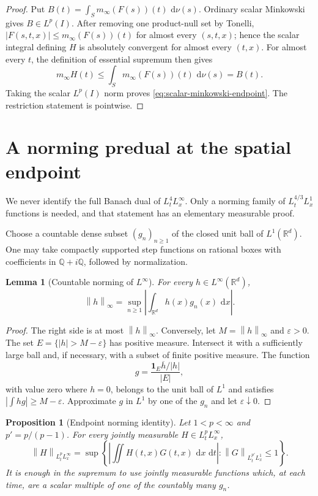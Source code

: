 \documentclass[11pt,oneside]{book}
\newtheorem{proposition}[theorem]{Proposition}
\newtheorem{lemma}[theorem]{Lemma}
\theoremstyle{definition}
\theoremstyle{remark}
\newcommand{\R}{\mathbb R}
\newcommand{\Q}{\mathbb Q}
\newcommand{\1}{\mathbf 1}
\newcommand{\dd}{\,\mathrm d}
\newcommand{\norm}[1]{\left\lVert #1\right\rVert}
\newcommand{\eps}{\varepsilon}
\begin{document}
\begin{proof}
Put $B(t)=\int_Sm_\infty(F(s))(t)\,\dd\nu(s)$.  Ordinary scalar
Minkowski gives $B\in L^p(I)$.  After removing one product-null set by
Tonelli, $|F(s,t,x)|\le m_\infty(F(s))(t)$ for almost every
$(s,t,x)$; hence the scalar integral defining $H$ is absolutely convergent
for almost every $(t,x)$.  For almost every $t$, the definition of essential
supremum then gives
\[
 m_\infty H(t)
 \le\int_Sm_\infty(F(s))(t)\,\dd\nu(s)=B(t).
\]
Taking the scalar $L^p(I)$ norm proves \eqref{eq:scalar-minkowski-endpoint}.  The restriction statement is pointwise.
\end{proof}

\section{A norming predual at the spatial endpoint}

We never identify the full Banach dual of $L^4_tL^\infty_x$.  Only a
norming family of $L^{4/3}_tL^1_x$ functions is needed, and that statement has
an elementary measurable proof.

Choose a countable dense subset $(g_n)_{n\ge1}$ of the closed unit ball of
$L^1(\R^d)$.  One may take compactly supported step functions on rational
boxes with coefficients in $\Q+i\Q$, followed by normalization.

\begin{lemma}[Countable norming of $L^\infty$]\label{lem:countable-norming-Linfty}
For every $h\in L^\infty(\R^d)$,
\begin{equation}
 \norm h_\infty
 =\sup_{n\ge1}\left|\int_{\R^d}h(x)g_n(x)\,\dd x\right|.
 \label{eq:countable-norming-Linfty}
\end{equation}
\end{lemma}

\begin{proof}
The right side is at most $\norm h_\infty$.  Conversely, let
$M=\norm h_\infty$ and $\eps>0$.  The set
$E=\{|h|>M-\eps\}$ has positive measure.  Intersect it with a sufficiently
large ball and, if necessary, with a subset of finite positive measure.  The
function
\[
 g=\frac{\1_E\overline{h}/|h|}{|E|},
\]
with value zero where $h=0$, belongs to the unit ball of $L^1$ and satisfies
$|\int hg|\ge M-\eps$.  Approximate $g$ in $L^1$ by one of the $g_n$ and let
$\eps\downarrow0$.
\end{proof}

\begin{proposition}[Endpoint norming identity]
\label{prop:endpoint-norming}
Let $1<p<\infty$ and $p'=p/(p-1)$.  For every jointly measurable
$H\in L^p_tL^\infty_x$,
\begin{equation}
 \norm H_{L^p_tL^\infty_x}
 =\sup\left\{
 \left|\iint H(t,x)G(t,x)\,\dd x\,\dd t\right|:
 \norm G_{L^{p'}_tL^1_x}\le1
 \right\}.
 \label{eq:endpoint-norming}
\end{equation}
It is enough in the supremum to use jointly measurable functions which, at
each time, are a scalar multiple of one of the countably many $g_n$.
\end{proposition}
\end{document}
